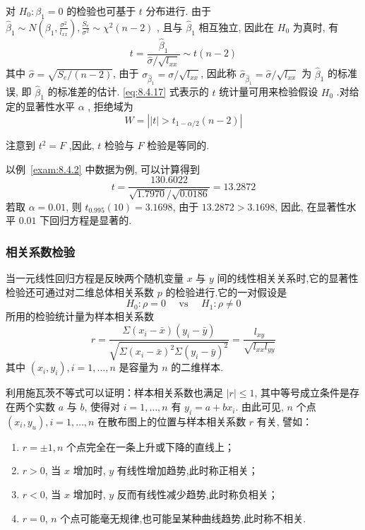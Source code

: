对 $H_0: \beta_1=0$ 的检验也可基于 $t$ 分布进行. 由于 $\hat{\beta}_{1} \sim N \left(\beta_{1}, \frac{\sigma^{2}}{l_{x x}}\right), \frac{S_{e}}{\sigma^{2}} \sim \chi^{2}(n-2)$ , 且与 $\hat{\beta}_1$ 相互独立, 因此在 $H_0$ 为真时, 有
\begin{equation}\label{eq:8.4.17}
t=\frac{\hat{\beta}_{1}}{\hat{\sigma} / \sqrt{l_{x x}}} \sim t(n-2) 
\end{equation}
其中 $\hat{\sigma} =\sqrt{S_{e}/(n-2)}$, 由于 $\sigma_{\hat{\beta}_1}=\sigma/\sqrt{l_{xx}}$, 因此称 $\hat{\sigma}_{\hat{\beta}_1}=\hat{\sigma}/\sqrt{l_{xx}} $ 为 $\hat{\beta}_1$ 的标准误, 即 $\hat{\beta}_1$ 的标准差的估计. \eqref{eq:8.4.17} 式表示的 $t$ 统计量可用来检验假设 $H_0$ .对给定的显著性水平 $\alpha$ , 拒绝域为
\begin{equation*}
W= \left| |t| > t_{1-\alpha/2} (n-2) \right|
\end{equation*}

注意到 $t^2=F$ ,因此, $t$ 检验与 $F$ 检验是等同的.

以例~\ref{exam:8.4.2} 中数据为例, 可以计算得到
\begin{equation*}
t=\frac{130.6022}{\sqrt{1.7970} / \sqrt{0.0186}}=13.2872
\end{equation*}
若取 $\alpha=0.01$, 则 $t_{0.995}(10)=3.1698$, 由于 $13.2872>3.1698$, 因此, 在显著性水平 $0.01$ 下回归方程是显著的.

\subsubsection{相关系数检验}

当一元线性回归方程是反映两个随机变量 $x$ 与 $y$ 间的线性相关关系时,它的显著性检验还可通过对二维总体相关系数 $p$ 的检验进行.它的一对假设是
\begin{equation}\label{eq:8.4.18}
H_{0} : \rho=0 \quad \text { vs } \quad H_{1} : \rho \neq 0
\end{equation}
所用的检验统计量为样本相关系数
\begin{equation}\label{eq:8.4.19}
r=\frac{\Sigma\left(x_{i}-\bar{x}\right)\left(y_{i}-\bar{y}\right)}{\sqrt{\Sigma\left(x_{i}-\bar{x}\right)^{2} \Sigma\left(y_{i}-\bar{y}\right)^{2}}}=\frac{l_{x y}}{\sqrt{l_{x x} l_{y y}}}
\end{equation}
其中 $(x_i,y_i), i=1, \ldots, n$ 是容量为 $n$ 的二维样本.

利用施瓦茨不等式可以证明：样本相关系数也满足  $\left| r \right|\le 1$, 其中等号成立条件是存在两个实数 $a$ 与 $b$, 使得对 $i=1,\ldots, n$ 有 $y_i = a + b x_i$. 由此可见, $n$ 个点 $(x_{i}, y_{u}), i=1, \ldots, n$ 在散布图上的位置与样本相关系数 $r$ 有关, 譬如：
\begin{enumerate}
  \item  $r = \pm 1,n$ 个点完全在一条上升或下降的直线上；
  \item  $r > 0$, 当 $x$ 增加时, $y$ 有线性增加趋势,此时称正相关；
  \item  $r < 0$, 当 $x$ 增加时, $y$ 反而有线性减少趋势,此时称负相关；
  \item  $r = 0$, $n$ 个点可能毫无规律,也可能呈某种曲线趋势,此时称不相关.
\end{enumerate}

